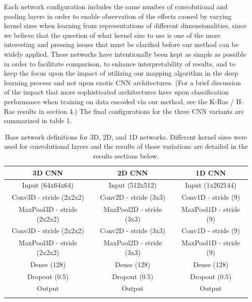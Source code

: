 \documentclass{article}
\begin{document}
Each network configuration includes the same number of convolutional and pooling layers in order to enable observation of the effects caused by varying kernel sizes when learning from representations of different dimensionalities, since we believe that the question of what kernel size to use is one of the more interesting and pressing issues that must be clarified before our method can be widely applied. These networks have intentionally been kept as simple as possible in order to facilitate comparison, to enhance interpretability of results, and to keep the focus upon the impact of utilizing our mapping algorithm in the deep learning process and not upon exotic CNN architectures. (For a brief discussion of the impact that more sophisticated architectures have upon classification performance when training on data encoded via our method, see the K-Ras / H-Ras results in section 4.) The final configurations for the three CNN variants are summarized in table 1.

\begin{table}[ht]
\centering
\begin{tabular}[t]{ccc}
\toprule
3D CNN & 2D CNN & 1D CNN \\
\midrule
Input (64x64x64) & Input (512x512) & Input (1x262144) \\

Conv3D - stride (2x2x2) & Conv2D - stride (3x3) & Conv1D - stride (9) \\

MaxPool3D - stride (2x2x2) & MaxPool2D - stride (3x3) & MaxPool1D - stride (9) \\

Conv3D - stride (2x2x2) & Conv2D - stride (3x3) & Conv1D - stride (9) \\

MaxPool3D - stride (2x2x2) & MaxPool2D - stride (3x3) & MaxPool1D - stride (9) \\

Dense (128) & Dense (128) & Dense (128) \\

Dropout (0.5) & Dropout (0.5) & Dropout (0.5) \\

Output & Output & Output \\
\bottomrule \\
\end{tabular}
\caption{Base network definitions for 3D, 2D, and 1D networks. Different kernel sizes were used for convolutional layers and the results of those variations are detailed in the results sections below.}
\label{table:1}
\end{table} 
\end{document}
